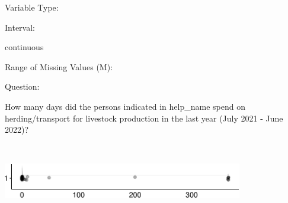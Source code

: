 \documentclass[
]{article}
\begin{document}
\begin{minipage}[t]{0.3\linewidth}

Variable Type:

\end{minipage}%
\begin{minipage}[t]{0.7\linewidth}

\end{minipage}

\begin{minipage}[t]{0.3\linewidth}

Interval:

\end{minipage}%
\begin{minipage}[t]{0.7\linewidth}

continuous

\end{minipage}

\begin{minipage}[t]{0.3\linewidth}

Range of Missing Values (M):

\end{minipage}%
\begin{minipage}[t]{0.7\linewidth}

\end{minipage}

\begin{minipage}[t]{0.3\linewidth}

Question:

\end{minipage}%
\begin{minipage}[t]{0.7\linewidth}

How many days did the persons indicated in help\_name spend on
herding/transport for livestock production in the last year (July 2021 -
June 2022)?

\end{minipage}

\begin{minipage}[t]{0.3\linewidth}

~

\end{minipage}%
\begin{minipage}[t]{0.7\linewidth}

\includegraphics[width=396px]{codebook_template_files/figure-latex/q7_38_rainplot-1}

\end{minipage}
 \vspace*{-6mm} 
\end{document}

